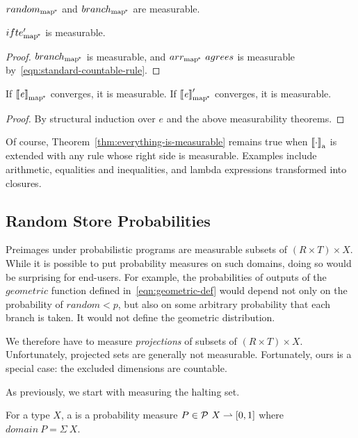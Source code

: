 \documentclass[preprint]{sigplanconf}
\newcommand{\pto}{\rightharpoonup}
\newcommand{\arrowarr}{\ensuremath{arr}}
\newcommand{\arrowif}{\ensuremath{ifte}}
\newcommand{\gen}{_\mathrm{a}}
\newcommand{\pmap}{_\mathrm{map^{\mspace{-2mu}*}}}
\newcommand{\arrpmap}{\arrowarr\pmap}
\newcommand{\ifpmap}{\arrowif\pmap}
\begin{document}
\begin{corollary}
$random\pmap$ and $branch\pmap$ are measurable.
\end{corollary}

\begin{theorem}
$\ifpmap'$ is measurable.
\end{theorem}
\begin{proof}
$branch\pmap$ is measurable, and $\arrpmap~agrees$ is measurable by~\eqref{eqn:standard-countable-rule}.
\end{proof}

\begin{theorem}
If $\meaningof{\mathit{e}}\pmap$ converges, it is measurable.
If $\meaningof{\mathit{e}}\pmap'$ converges, it is measurable.
\label{thm:everything-is-measurable}
\end{theorem}
\begin{proof}
By structural induction over $\mathit{e}$ and the above measurability theorems.
\end{proof}

Of course, Theorem~\ref{thm:everything-is-measurable} remains true when $\meaningof{\cdot}\gen$ is extended with any rule whose right side is measurable.
Examples include arithmetic, equalities and inequalities, and lambda expressions transformed into closures.

\subsection{Random Store Probabilities}

Preimages under probabilistic programs are measurable subsets of $(R \times T) \times X$.
While it is possible to put probability measures on such domains, doing so would be surprising for end-users.
For example, the probabilities of outputs of the $geometric$ function defined in~\eqref{eqn:geometric-def} would depend not only on the probability of $random < p$, but also on some arbitrary probability that each branch is taken.
It would not define the geometric distribution.

We therefore have to measure \emph{projections} of subsets of $(R \times T) \times X$.
Unfortunately, projected sets are generally not measurable.
Fortunately, ours is a special case: the excluded dimensions are countable.

As previously, we start with measuring the halting set.

\begin{definition}
For a type $X$, a  is a probability measure $P \in \powerset~X \pto [0,1]$ where $domain~P = \Sigma~X$.
\end{definition}
\end{document}
